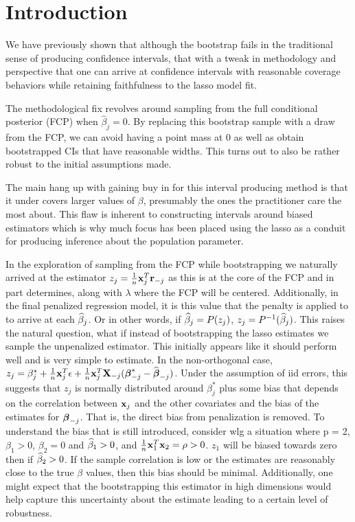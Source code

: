 \section{Introduction}

We have previously shown that although the bootstrap fails in the traditional sense of producing confidence intervals, that with a tweak in methodology and perspective that one can arrive at confidence intervals with reasonable coverage behaviors while retaining faithfulness to the lasso model fit. 

The methodological fix revolves around sampling from the full conditional posterior (FCP) when $\hat{\beta}_j = 0$. By replacing this bootstrap sample with a draw from the FCP, we can avoid having a point mass at 0 as well as obtain bootstrapped CIs that have reasonable widths. This turns out to also be rather robust to the initial assumptions made.

The main hang up with gaining buy in for this interval producing method is that it under covers larger values of $\beta$, presumably the ones the practitioner care the most about. This flaw is inherent to constructing intervals around biased estimators which is why much focus has been placed using the lasso as a conduit for producing inference about the population parameter. 

In the exploration of sampling from the FCP while bootstrapping we naturally arrived at the estimator $z_j = \frac{1}{n}\mathbf{x}_j^T\mathbf{r}_{-j}$ as this is at the core of the FCP and in part determines, along with $\lambda$ where the FCP will be centered. Additionally, in the final penalized regression model, it is this value that the penalty is applied to to arrive at each $\widehat{\beta}_j$. Or in other words, if $\widehat{\beta}_j = P(z_j)$,  $z_j = P^{-1}(\widehat{\beta}_j)$. This raises the natural question, what if instead of bootstrapping the lasso estimates we sample the unpenalized estimator. This initially appears like it should perform well and is very simple to estimate. In the non-orthogonal case, $z_j = \beta^*_j + \frac{1}{n}\mathbf{x}_j^T \epsilon + \frac{1}{n}\mathbf{x}_j^T \mathbf{X}_{-j}(\boldsymbol{\beta}^*_{-j} - \widehat{\boldsymbol{\beta}}_{-j})$. Under the assumption of iid errors, this suggests that $z_j$ is normally distributed around $\beta^*_j$ plus some bias that depends on the correlation between $\mathbf{x}_j$ and the other covariates and the bias of the estimates for $\boldsymbol{\beta}_{-j}$. That is, the direct bias from penalization is removed. To understand the bias that is still introduced, consider wlg a situation where p = 2, $\beta_1 > 0$, $\beta_2 = 0$ and $\widehat{\beta}_1 > 0$, and $\frac{1}{n}\mathbf{x}_1^T\mathbf{x}_2 = \rho > 0$. $z_1$ will be biased towards zero then if $\widehat{\beta}_2 > 0$. If the sample correlation is low or the estimates are reasonably close to the true $\beta$ values, then this bias should be minimal. Additionally, one might expect that the bootstrapping this estimator in high dimensions would help capture this uncertainty about the estimate leading to a certain level of robustness.

